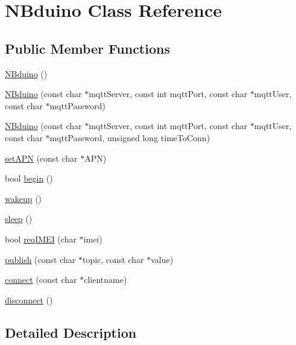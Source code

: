 \hypertarget{class_n_bduino}{}\section{N\+Bduino Class Reference}
\label{class_n_bduino}
\subsection*{Public Member Functions}
\begin{DoxyCompactItemize}
\item 
\mbox{\hyperlink{class_n_bduino_acd7c1c69bffccefc807ff89394732a7d}{N\+Bduino}} ()
\item 
\mbox{\hyperlink{class_n_bduino_a33e6b13bdee69684a051f00a1a15ddd1}{N\+Bduino}} (const char $\ast$mqtt\+Server, const int mqtt\+Port, const char $\ast$mqtt\+User, const char $\ast$mqtt\+Password)
\item 
\mbox{\hyperlink{class_n_bduino_aa6755807828b9a368128681b05494b2b}{N\+Bduino}} (const char $\ast$mqtt\+Server, const int mqtt\+Port, const char $\ast$mqtt\+User, const char $\ast$mqtt\+Password, unsigned long time\+To\+Conn)
\item 
\mbox{\hyperlink{class_n_bduino_a25ed04c59841533708771bdd835a2572}{set\+A\+PN}} (const char $\ast$A\+PN)
\item 
bool \mbox{\hyperlink{class_n_bduino_ae8241f6dcfe492f00f8bef4b5d4b79a0}{begin}} ()
\item 
\mbox{\hyperlink{class_n_bduino_a8e740e7b90e6e75b7dd3b7900ee0dd22}{wakeup}} ()
\item 
\mbox{\hyperlink{class_n_bduino_ac7bf8f7f0552ad2cbda4b3e91a82bfca}{sleep}} ()
\item 
bool \mbox{\hyperlink{class_n_bduino_acb71b20e54269da260903604482f1d33}{req\+I\+M\+EI}} (char $\ast$imei)
\item 
\mbox{\hyperlink{class_n_bduino_a3179d72e8766be6bd07892ddd4ad6be1}{publish}} (const char $\ast$topic, const char $\ast$value)
\item 
\mbox{\hyperlink{class_n_bduino_ae6f5bcc9277d871d7697e3e993c25c09}{connect}} (const char $\ast$clientname)
\item 
\mbox{\hyperlink{class_n_bduino_ae013d9c6d18771efa34f9805039a0127}{disconnect}} ()
\end{DoxyCompactItemize}


\subsection{Detailed Description}


